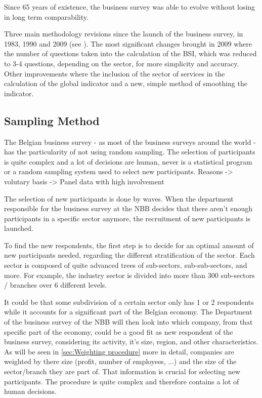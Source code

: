 \documentclass[12pt,a4paper,oneside]{book}
\begin{document}
Since 65 years of existence, the business survey was able to evolve without losing in long term comparability.

Three main methodology revisions since the launch of the business survey, in 1983, 1990 and 2009 (see \cite{de_greef_national_2009}).
The most significant changes brought in 2009 where the number of questions taken into the calculation of the BSI, which was reduced to 3-4 questions, depending on the sector, for more simplicity and accuracy.
Other improvements where the inclusion of the sector of services in the calculation of the global indicator and a new, simple method of smoothing the indicator.

\subsection{Sampling Method}
\label{sec:Recruitment of participants}

The Belgian business survey - as most of the business surveys around the world - has the particularity of not using random sampling. 
The selection of participants is quite complex and a lot of decisions are human, never is a statistical program or a random sampling system used to select new participants.
Reasons 
-> volutary basis
-> Panel data with high involvement


The selection of new participants is done by waves. When the department responsible for the business survey at the NBB decides that there aren't enough participants in a specific sector anymore, the recruitment of new participants is launched.

To find the new respondents, the first step is to decide for an optimal amount of new participants needed, regarding the different stratification of the sector.
Each sector is composed of quite advanced trees of sub-sectors, sub-sub-sectors,  and more. For example, the industry sector is divided into more than 300 sub-sectors / branches over 6 different levels. 

It could be that some subdivision of a certain sector only has 1 or 2 respondents while it accounts for a significant part of the Belgian economy. The Department of the business survey of the NBB will then look into which company, from that specific part of the economy, could be a good fit as new respondent of the business survey, considering its activity, it's size, region, and other characteristics.
As will be seen in \autoref{sec:Weighting procedure} more in detail, companies are weighted by there size (profit, number of employees, ...) and the size of the sector/branch they are part of. That information is crucial for selecting new participants.
The procedure is quite complex and therefore contains a lot of human decisions.
 
\end{document}
